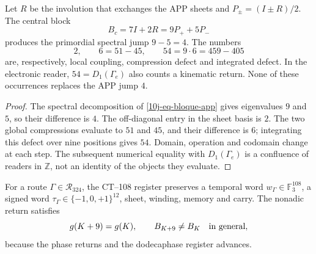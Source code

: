 \begin{proposition}
\label{10j-prop-cuatro-cincuentaycuatro}
Let \(R\) be the involution that exchanges the APP sheets and \(P_\pm=(I\pm R)/2\). The central block
\begin{equation}
 B_c=7I+2R=9P_++5P_-
 \label{10j-eq-bloque-app}
\end{equation}
produces the primordial spectral jump \(9-5=4\). The numbers
\begin{equation}
 2,\qquad 6=51-45,\qquad
 54=9\cdot6=459-405
 \label{10j-eq-despliegue-2-6-54}
\end{equation}
are, respectively, local coupling, compression defect and integrated defect. In the electronic reader, \(54=D_1(\Gamma_e)\) also counts a kinematic return. None of these occurrences replaces the APP jump \(4\).
\end{proposition}

\begin{proof}
The spectral decomposition of \eqref{10j-eq-bloque-app} gives eigenvalues \(9\) and \(5\), so their difference is \(4\). The off-diagonal entry in the sheet basis is \(2\). The two global compressions evaluate to \(51\) and \(45\), and their difference is \(6\); integrating this defect over nine positions gives \(54\). Domain, operation and codomain change at each step. The subsequent numerical equality with \(D_1(\Gamma_e)\) is a confluence of readers in \(\mathbb Z\), not an identity of the objects they evaluate.
\end{proof}

For a route \(\Gamma\in\mathcal R_{324}\), the CT--108 register preserves a temporal word \(w_\Gamma\in\mathbb F_3^{108}\), a signed word \(\tau_\Gamma\in\{-1,0,+1\}^{12}\), sheet, winding, memory and carry. The nonadic return satisfies
\begin{equation}
 g(K+9)=g(K),\qquad B_{K+9}\ne B_K\quad\hbox{in general},
 \label{10j-eq-retorno-memoria}
\end{equation}
because the phase returns and the dodecaphase register advances.

